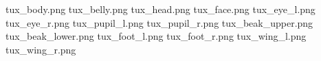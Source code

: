 tux_body.png
tux_belly.png
tux_head.png
tux_face.png
tux_eye_l.png
tux_eye_r.png
tux_pupil_l.png
tux_pupil_r.png
tux_beak_upper.png
tux_beak_lower.png
tux_foot_l.png
tux_foot_r.png
tux_wing_l.png
tux_wing_r.png
